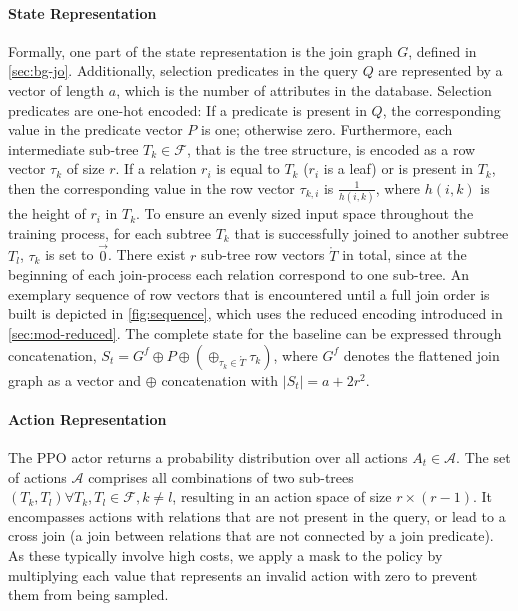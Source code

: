 \documentclass[10pt, conference]{IEEEtran}
\begin{document}
\paragraph{State Representation}
\label{sec:state-rep}
Formally, one part of the state representation is the join graph $G$, defined in \autoref{sec:bg-jo}.
Additionally, selection predicates in the query $Q$ are represented by a vector of length $a$, which is the number of attributes in the database.
Selection predicates are one-hot encoded: If a predicate is present in $Q$, the corresponding value in the predicate vector $P$ is one; otherwise zero.
Furthermore, each intermediate sub-tree $T_k \in \mathcal{F}$, that is the tree structure, is encoded as a row vector $\tau_k$ of size $r$.
If a relation $r_i$ is equal to $T_k$ ($r_i$ is a leaf) or is present in $T_k$, then the corresponding value in the row vector $\tau_{k,i}$ is $\frac{1}{h(i, k)}$, where $h(i, k)$ is the height of $r_i$ in $T_k$.
To ensure an evenly sized input space throughout the training process, for each subtree $T_k$ that is successfully joined to another subtree $T_l$, $\tau_{k}$ is set to $\vec{0}$.
There exist $r$ sub-tree row vectors $\mathring{T}$ in total, since at the beginning of each join-process each relation correspond to one sub-tree.
An exemplary sequence of row vectors that is encountered until a full join order is built is depicted in \autoref{fig:sequence}, which 
uses the reduced encoding introduced in \autoref{sec:mod-reduced}.
The complete state for the baseline can be expressed through concatenation, $S_t = G^f \oplus P \oplus (\oplus_{\tau_k \in \mathring{T}} \tau_k)$, where $G^f$ denotes the flattened join graph as a vector and $\oplus$ concatenation with $|S_t| = a + 2r^2$.

\paragraph{Action Representation}
The PPO actor returns a probability distribution over all actions $A_t \in \mathcal{A}$.
The set of actions $\mathcal{A}$ comprises all combinations of two sub-trees $(T_k, T_l) \forall T_k, T_l \in \mathcal{F}, k \neq l$, resulting in an action space of size $r \times (r -1)$.
It encompasses actions with relations that are not present in the query, or lead to a cross join (\ie a join between relations that are not connected by a join predicate). As these typically involve high costs, we apply a mask to the policy by multiplying each value that represents an invalid action with zero to prevent them from being sampled.
\end{document}
